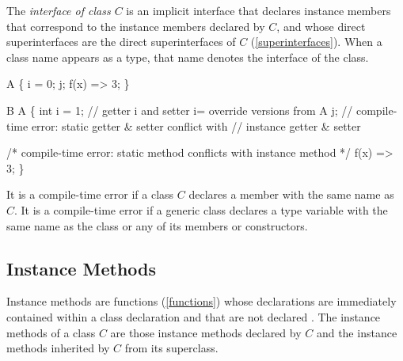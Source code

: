 \documentclass{article}
\begin{document}
\LMHash{}
The {\em interface of class $C$} is an implicit interface that declares instance members that correspond to the instance members declared by $C$, and whose direct superinterfaces are the direct superinterfaces of $C$ (\ref{superinterfaces}).
When a class name appears as a type, that name denotes the interface of the class.




\begin{dartCode}
\CLASS{} A \{
  \VAR{} i = 0;
  \VAR{} j;
  f(x) => 3;
\}

\CLASS{} B \EXTENDS{} A \{
  int i = 1; // getter i and setter i= override versions from A
  \STATIC{} j; // compile-time error: static getter \& setter conflict with
  // instance getter \& setter

  /* compile-time error: static method conflicts with instance method */
  \STATIC{} f(x) => 3;
\}
\end{dartCode}

\LMHash{}
It is a compile-time error if a class $C$ declares a member with the same name as $C$.
It is a compile-time error if a generic class declares a type variable with the same name as the class or any of its members or constructors.


\subsection{Instance Methods}

\LMHash{}
Instance methods are functions (\ref{functions}) whose declarations are immediately contained within a class declaration and that are not declared \STATIC{}.
The instance methods of a class $C$ are those instance methods declared by $C$ and the instance methods inherited by $C$ from its superclass.
\end{document}
